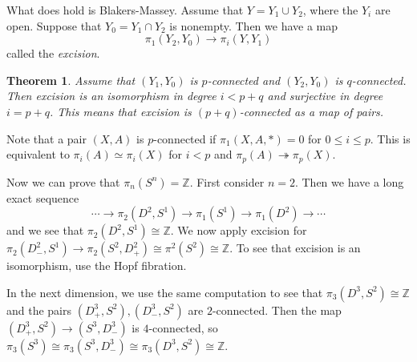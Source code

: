 \documentclass[leqno, openany]{memoir}
\newtheorem{thm}{Theorem}[section]
\theoremstyle{definition}
\theoremstyle{remark}
\theoremstyle{plain}
\theoremstyle{definition}
\theoremstyle{remark}
\newcommand{\Z}{\mathbb{Z}}
\begin{document}
What does hold is Blakers-Massey. Assume that $Y = Y_1 \cup Y_2$, where the $Y_i$ are open. Suppose that $Y_0 = Y_1 \cap Y_2$ is nonempty. Then we have a map
    \[ \pi_1(Y_2, Y_0) \to \pi_i(Y, Y_1) \]
    called the \textit{excision}. 

\begin{thm}
    Assume that $(Y_1, Y_0)$ is $p$-connected and $(Y_2, Y_0)$ is $q$-connected. Then excision is an isomorphism in degree $i < p+q$ and surjective in degree $i = p+q$. This means that excision is $(p+q)$-connected as a map of pairs.
\end{thm}

Note that a pair $(X,A)$ is $p$-connected if $\pi_1(X,A,*) = 0$ for $0 \leq i \leq p$. This is equivalent to $\pi_i(A) \simeq \pi_i(X)$ for $i < p$ and $\pi_p(A) \twoheadrightarrow \pi_p(X)$.

Now we can prove that $\pi_n(S^n) = \Z$. First consider $n = 2$. Then we have a long exact sequence
\[ \cdots \to \pi_2(D^2, S^1) \to \pi_1(S^1) \to \pi_1(D^2) \to \cdots \]
and we see that $\pi_2(D^2, S^1) \cong \Z$. We now apply excision for $\pi_2(D^2_-, S^1) \to \pi_2(S^2, D^2_+) \cong \pi^2(S^2) \cong \Z$. To see that excision is an isomorphism, use the Hopf fibration.

In the next dimension, we use the same computation to see that $\pi_3(D^3, S^2) \cong \Z$ and the pairs $(D^3_+, S^2), (D^3_-, S^2)$ are $2$-connected. Then the map $(D^3_+, S^2) \to (S^3, D^3_-)$ is $4$-connected, so $\pi_3(S^3) \cong \pi_3(S^3, D^3_-) \cong \pi_3(D^3, S^2) \cong \Z$.
\end{document}

